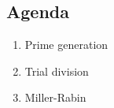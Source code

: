 

\subsection{Agenda}
\begin{enumerate}
\item Prime generation
\item Trial division
\item Miller-Rabin
\end{enumerate}
